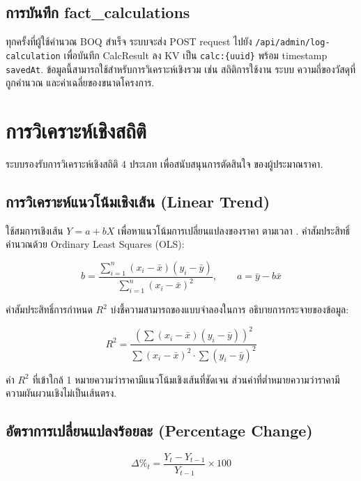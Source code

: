 \subsection{การบันทึก fact\_calculations}

ทุกครั้งที่ผู้ใช้คำนวณ BOQ สำเร็จ ระบบจะส่ง POST request ไปยัง
\texttt{/api/admin/log-calculation} เพื่อบันทึก CalcResult ลง KV
เป็น \texttt{calc:\{uuid\}} พร้อม timestamp \texttt{savedAt}.
ข้อมูลนี้สามารถใช้สำหรับการวิเคราะห์เชิงรวม เช่น สถิติการใช้งาน
ระบบ ความถี่ของวัสดุที่ถูกคำนวณ และค่าเฉลี่ยของขนาดโครงการ.

\section{การวิเคราะห์เชิงสถิติ}
\label{sec:stats}

ระบบรองรับการวิเคราะห์เชิงสถิติ 4 ประเภท เพื่อสนับสนุนการตัดสินใจ
ของผู้ประมาณราคา.

\subsection{การวิเคราะห์แนวโน้มเชิงเส้น (Linear Trend)}

ใช้สมการเชิงเส้น $Y = a + bX$ เพื่อหาแนวโน้มการเปลี่ยนแปลงของราคา
ตามเวลา \cite{ashworth2015}. ค่าสัมประสิทธิ์คำนวณด้วย Ordinary Least
Squares (OLS):

\begin{equation}
b = \frac{\sum_{i=1}^{n}(x_i - \bar{x})(y_i - \bar{y})}{\sum_{i=1}^{n}(x_i - \bar{x})^2},
\qquad a = \bar{y} - b\bar{x}
\end{equation}

ค่าสัมประสิทธิ์การกำหนด $R^2$ บ่งชี้ความสามารถของแบบจำลองในการ
อธิบายการกระจายของข้อมูล:

\begin{equation}
R^2 = \frac{\left(\sum (x_i - \bar{x})(y_i - \bar{y})\right)^2}
            {\sum (x_i - \bar{x})^2 \cdot \sum (y_i - \bar{y})^2}
\end{equation}

ค่า $R^2$ ที่เข้าใกล้ 1 หมายความว่าราคามีแนวโน้มเชิงเส้นที่ชัดเจน
ส่วนค่าที่ต่ำหมายความว่าราคามีความผันผวนเชิงไม่เป็นเส้นตรง.

\subsection{อัตราการเปลี่ยนแปลงร้อยละ (Percentage Change)}

\begin{equation}
\Delta\%_t = \frac{Y_t - Y_{t-1}}{Y_{t-1}} \times 100
\end{equation}

